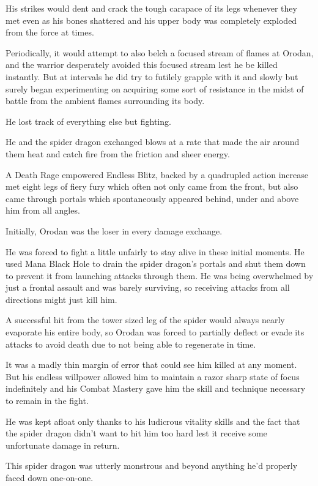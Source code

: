 \documentclass[a4paper,10pt]{book}
\begin{document}
His strikes would dent and crack the tough carapace of its legs whenever they met even as his bones shattered and his upper body was completely exploded from the force at times.\par
Periodically, it would attempt to also belch a focused stream of flames at Orodan, and the warrior desperately avoided this focused stream lest he be killed instantly. But at intervals he did try to futilely grapple with it and slowly but surely began experimenting on acquiring some sort of resistance in the midst of battle from the ambient flames surrounding its body.\par
He lost track of everything else but fighting.\par
He and the spider dragon exchanged blows at a rate that made the air around them heat and catch fire from the friction and sheer energy.\par
A Death Rage empowered Endless Blitz, backed by a quadrupled action increase met eight legs of fiery fury which often not only came from the front, but also came through portals which spontaneously appeared behind, under and above him from all angles.\par
Initially, Orodan was the loser in every damage exchange.\par
He was forced to fight a little unfairly to stay alive in these initial moments. He used Mana Black Hole to drain the spider dragon’s portals and shut them down to prevent it from launching attacks through them. He was being overwhelmed by just a frontal assault and was barely surviving, so receiving attacks from all directions might just kill him.\par
A successful hit from the tower sized leg of the spider would always nearly evaporate his entire body, so Orodan was forced to partially deflect or evade its attacks to avoid death due to not being able to regenerate in time.\par
It was a madly thin margin of error that could see him killed at any moment. But his endless willpower allowed him to maintain a razor sharp state of focus indefinitely and his Combat Mastery gave him the skill and technique necessary to remain in the fight.\par
He was kept afloat only thanks to his ludicrous vitality skills and the fact that the spider dragon didn’t want to hit him too hard lest it receive some unfortunate damage in return.\par
This spider dragon was utterly monstrous and beyond anything he’d properly faced down one-on-one.\par
\end{document}
